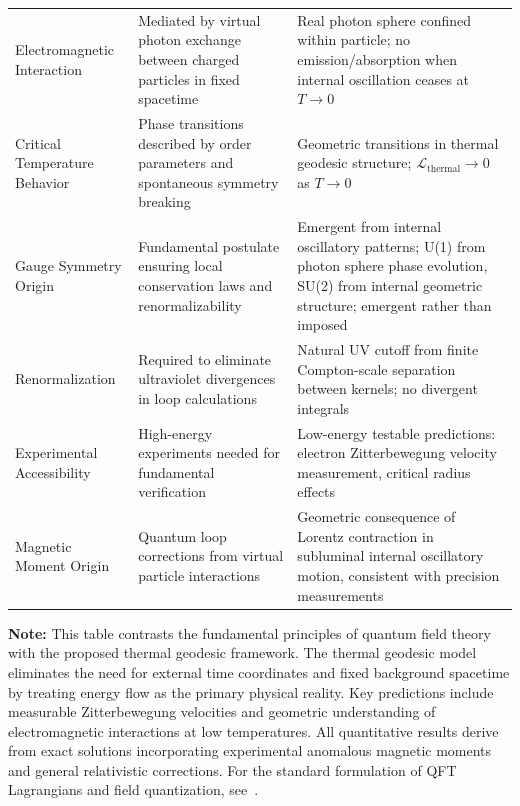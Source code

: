 \documentclass[%
 reprint,
 amsmath,amssymb,
 aps,
]{revtex4-1}
\numberwithin{equation}{section}%
\begin{document}
\begin{table}[!htbp]
\begin{tabular}{p{4.8cm}p{6.2cm}p{6.2cm}}
\addlinespace[0.3cm]
Electromagnetic Interaction & Mediated by virtual photon exchange between charged particles in fixed spacetime & Real photon sphere confined within particle; no emission/absorption when internal oscillation ceases at $T \to 0$ \\
\addlinespace[0.3cm]
Critical Temperature Behavior & Phase transitions described by order parameters and spontaneous symmetry breaking & Geometric transitions in thermal geodesic structure; $\mathcal{L}_{\text{thermal}} \to 0$ as $T \to 0$ \\
\addlinespace[0.3cm]
Gauge Symmetry Origin & Fundamental postulate ensuring local conservation laws and renormalizability & Emergent from internal oscillatory patterns; U(1) from photon sphere phase evolution, SU(2) from internal geometric structure; emergent rather than imposed~\cite{hanamura2506.0072} \\
\addlinespace[0.3cm]
Renormalization & Required to eliminate ultraviolet divergences in loop calculations & Natural UV cutoff from finite Compton-scale separation between kernels; no divergent integrals \\
\addlinespace[0.3cm]
Experimental Accessibility & High-energy experiments needed for fundamental verification & Low-energy testable predictions: electron Zitterbewegung velocity measurement, critical radius effects \\
\addlinespace[0.3cm]
Magnetic Moment Origin & Quantum loop corrections from virtual particle interactions & Geometric consequence of Lorentz contraction in subluminal internal oscillatory motion, consistent with precision measurements~\cite{fan2023} \\
\bottomrule
\end{tabular}
\vspace{0.2cm}
\begin{flushleft}
\footnotesize
\textbf{Note:} This table contrasts the fundamental principles of quantum field theory with the proposed thermal geodesic framework. The thermal geodesic model eliminates the need for external time coordinates and fixed background spacetime by treating energy flow as the primary physical reality. Key predictions include measurable Zitterbewegung velocities and geometric understanding of electromagnetic interactions at low temperatures. All quantitative results derive from exact solutions incorporating experimental anomalous magnetic moments and general relativistic corrections. For the standard formulation of QFT Lagrangians and field quantization, see~\cite{weinberg1995}.
\end{flushleft}
\end{table}
\end{document}
